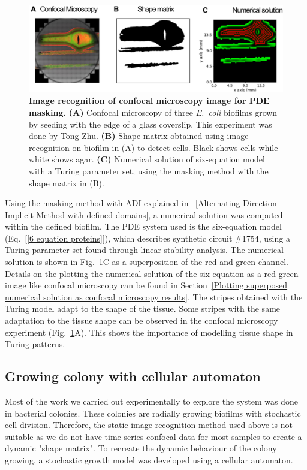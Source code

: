 \begin{figure}[H]
    \centering

    \includegraphics[width=1\textwidth]{chapters/Chapter 3/shmoo}
    \caption{\textbf{Image recognition of confocal microscopy image for PDE masking.} \textbf{(A)} Confocal microscopy of three \textit{E.~coli} biofilms grown by seeding with the edge of a glass coverslip. This experiment was done by Tong Zhu. \textbf{(B)} Shape matrix obtained using image recognition on biofilm in (A) to detect cells. Black shows cells while white shows agar. \textbf{(C)} Numerical solution of six-equation model with a Turing parameter set, using the masking method with the shape matrix in (B).}
    \label{shmoo}
\end{figure}
Using the masking method with ADI explained in ~\ref{Alternating Direction Implicit Method with defined domains}, a numerical solution was computed within the defined biofilm.
The PDE system used is the six-equation model (Eq.~\ref{[6 equation proteins]}), which describes synthetic circuit \#1754, using a Turing parameter set found through linear stability analysis.
The numerical solution is shown in Fig.~\ref{shmoo}C as a superposition of the red and green channel.
Details on the plotting the numerical solution of the six-equation as a red-green image like confocal microscopy can be found in Section~\ref{Plotting superposed numerical solution as confocal microscopy results}.
The stripes obtained with the Turing model adapt to the shape of the tissue.
Some stripes with the same adaptation to the tissue shape can be observed in the confocal microscopy experiment (Fig.~\ref{shmoo}A).
This shows the importance of modelling tissue shape in Turing patterns.

\subsection{Growing colony with cellular automaton}
Most of the work we carried out experimentally to explore the system was done in bacterial colonies.
These colonies are radially growing biofilms with stochastic cell division.
Therefore, the static image recognition method used above is not suitable as we do not have time-series confocal data for most samples to create a dynamic "shape matrix".
To recreate the dynamic behaviour of the colony growing, a stochastic growth model was developed using a cellular automaton.

